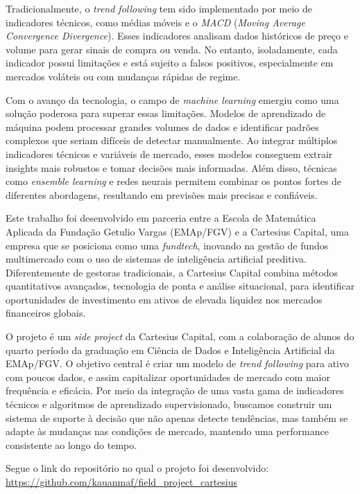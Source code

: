 \documentclass{article}
\begin{document}
Tradicionalmente, o \textit{trend following} tem sido implementado por meio de indicadores técnicos, como médias móveis e o \textit{MACD} (\textit{Moving Average Convergence Divergence}). Esses indicadores analisam dados históricos de preço e volume para gerar sinais de compra ou venda. No entanto, isoladamente, cada indicador possui limitações e está sujeito a falsos positivos, especialmente em mercados voláteis ou com mudanças rápidas de regime.

Com o avanço da tecnologia, o campo de \textit{machine learning} emergiu como uma solução poderosa para superar essas limitações. Modelos de aprendizado de máquina podem processar grandes volumes de dados e identificar padrões complexos que seriam difíceis de detectar manualmente. Ao integrar múltiplos indicadores técnicos e variáveis de mercado, esses modelos conseguem extrair insights mais robustos e tomar decisões mais informadas. Além disso, técnicas como \textit{ensemble learning} e redes neurais permitem combinar os pontos fortes de diferentes abordagens, resultando em previsões mais precisas e confiáveis.

Este trabalho foi desenvolvido em parceria entre a Escola de Matemática Aplicada da Fundação Getulio Vargas (EMAp/FGV) e a Cartesius Capital, uma empresa que se posiciona como uma \textit{fundtech}, inovando na gestão de fundos multimercado com o uso de sistemas de inteligência artificial preditiva. Diferentemente de gestoras tradicionais, a Cartesius Capital combina métodos quantitativos avançados, tecnologia de ponta e análise situacional, para identificar oportunidades de investimento em ativos de elevada liquidez nos mercados financeiros globais.

O projeto é um \textit{side project} da Cartesius Capital, com a colaboração de alunos do quarto período da graduação em Ciência de Dados e Inteligência Artificial da EMAp/FGV. O objetivo central é criar um modelo de \textit{trend following} para ativo com poucos dados, e assim capitalizar oportunidades de mercado com maior frequência e eficácia. Por meio da integração de uma vasta gama de indicadores técnicos e algoritmos de aprendizado supervisionado, buscamos construir um sistema de suporte à decisão que não apenas detecte tendências, mas também se adapte às mudanças nas condições de mercado, mantendo uma performance consistente ao longo do tempo.

Segue o link do repositório no qual o projeto foi desenvolvido: \url{https://github.com/kauanmaf/field_project_cartesius}
\end{document}
